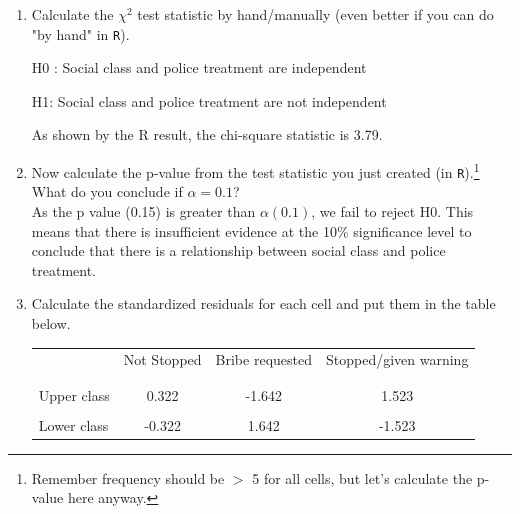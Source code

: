 \documentclass[12pt,letterpaper]{article}
\begin{document}
\begin{enumerate}
	
	\item [(a)]
	Calculate the $\chi^2$ test statistic by hand/manually (even better if you can do "by hand" in \texttt{R}).\\
	\vspace{.4cm}
	
	  
	 
	   
	 
	H0 : Social class and police treatment are independent 
	
	H1: Social class and police treatment are not independent
	
    
	As shown by the R result, the chi-square statistic is 3.79.
	
	\item [(b)]
	Now calculate the p-value from the test statistic you just created (in \texttt{R}).\footnote{Remember frequency should be $>$ 5 for all cells, but let's calculate the p-value here anyway.}  What do you conclude if $\alpha = 0.1$?\\
	
	 
	
	
	
	As the p value (0.15) is greater than $\alpha (0.1)$, we fail  to
	reject H0. This means that there is  insufficient evidence at the 10\% significance level to conclude that there is a relationship between social class and police treatment.
	
	\newpage
	\item [(c)] Calculate the standardized residuals for each cell and put them in the table below.
	\vspace{1cm}
	
	\begin{table}[h]
		\centering
		\begin{tabular}{l | c c c }
			& Not Stopped & Bribe requested & Stopped/given warning \\
			\\[-1.8ex] 
			\hline \\[-1.8ex]
			Upper class   & 0.322  & -1.642 & 1.523  \\
			\\
			Lower class  & -0.322 &  1.642 & -1.523 \\
			

\end{tabular}
\end{table}
\end{enumerate}
\end{document}
